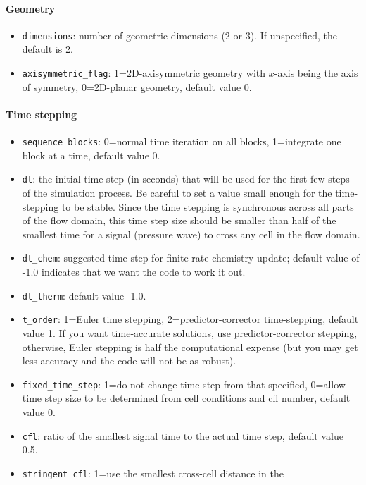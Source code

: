 \paragraph{Geometry}
\begin{itemize}
\item \texttt{dimensions}: number of geometric dimensions (2 or 3).  
  If unspecified, the default is 2.
\item \texttt{axisymmetric\_flag}: 1=2D-axisymmetric geometry with $x$-axis being the axis of symmetry,
  0=2D-planar geometry, default value 0.
\end{itemize}

\paragraph{Time stepping}
\begin{itemize}
\item \texttt{sequence\_blocks}: 0=normal time iteration on all blocks, 1=integrate one block
  at a time, default value 0.
\item \texttt{dt}\ddag: the initial time step (in seconds) that will be used for the
  first few steps of the simulation process.
  Be careful to set a value small enough for the time-stepping to be stable.
  Since the time stepping is synchronous across all parts of the flow domain,
  this time step size should be smaller than half of the smallest time for a signal
  (pressure wave) to cross any cell in the flow domain. 
\item \texttt{dt\_chem}: suggested time-step for finite-rate chemistry update;
  default value of -1.0 indicates that we want the code to work it out.
\item \texttt{dt\_therm}: default value -1.0.
\item \texttt{t\_order}\ddag: 1=Euler time stepping, 2=predictor-corrector
  time-stepping, default value 1.
  If you want time-accurate solutions, use predictor-corrector stepping,
  otherwise, Euler stepping is half the computational expense 
  (but you may get less accuracy and the code will not be as robust).
\item \texttt{fixed\_time\_step}\ddag: 1=do not change time step from that specified, 
  0=allow time step size to be determined from cell conditions and cfl number, default value 0.
\item \texttt{cfl}\ddag: ratio of the smallest signal time to the actual time step,
  default value 0.5.
\item \texttt{stringent\_cfl}\ddag: 1=use the smallest cross-cell distance in the

\end{itemize}
